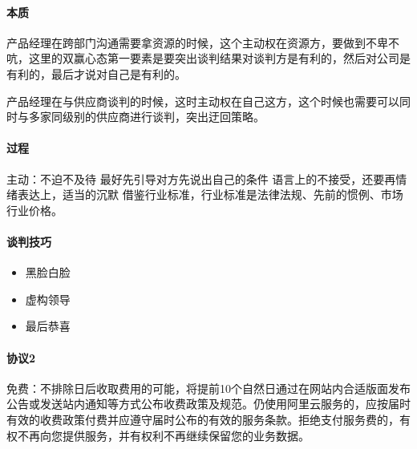 \documentclass[letterpaper,11pt,english]{sphinxmanual}
\begin{document}
\paragraph{本质}
\label{\detokenize{chapter_idea/negotiation:id2}}
产品经理在跨部门沟通需要拿资源的时候，这个主动权在资源方，要做到不卑不吭，这里的双赢心态第一要素是要突出谈判结果对谈判方是有利的，然后对公司是有利的，最后才说对自己是有利的。

产品经理在与供应商谈判的时候，这时主动权在自己这方，这个时候也需要可以同时与多家同级别的供应商进行谈判，突出迂回策略。


\paragraph{过程}
\label{\detokenize{chapter_idea/negotiation:id3}}
主动：不迫不及待 最好先引导对方先说出自己的条件
语言上的不接受，还要再情绪表达上，适当的沉默
借鉴行业标准，行业标准是法律法规、先前的惯例、市场行业价格。


\paragraph{谈判技巧}
\label{\detokenize{chapter_idea/negotiation:id4}}\begin{itemize}
\item {} 
黑脸白脸

\item {} 
虚构领导

\item {} 
最后恭喜

\end{itemize}


\paragraph{协议2\sphinxfootnotemark[326]}
\label{\detokenize{chapter_idea/negotiation:id5}}%
\begin{footnotetext}[326]\sphinxAtStartFootnote
{}
%
\end{footnotetext}\ignorespaces 
免费：不排除日后收取费用的可能，将提前10个自然日通过在网站内合适版面发布公告或发送站内通知等方式公布收费政策及规范。仍使用阿里云服务的，应按届时有效的收费政策付费并应遵守届时公布的有效的服务条款。拒绝支付服务费的，有权不再向您提供服务，并有权利不再继续保留您的业务数据。
\end{document}
